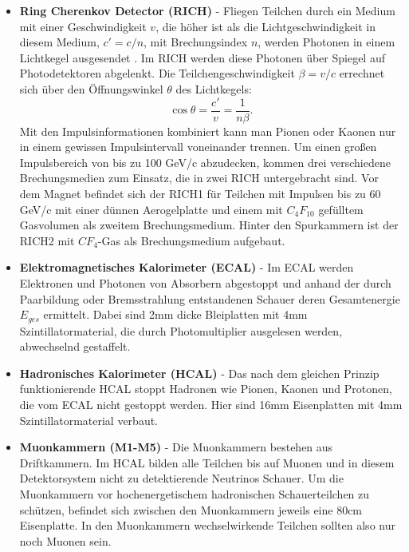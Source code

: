 \documentclass{article}
\begin{document}
\begin{itemize}
\item \textbf{Ring Cherenkov Detector (RICH)}  \cite{SISSA2008} - Fliegen Teilchen durch ein Medium mit einer Geschwindigkeit $v$, die höher ist als die Lichtgeschwindigkeit in diesem Medium, $c'=c/n$, mit Brechungsindex $n$, werden Photonen in einem Lichtkegel ausgesendet \cite{Cerenkov1937}. Im RICH werden diese Photonen über Spiegel auf Photodetektoren abgelenkt. Die Teilchengeschwindigkeit $\beta=v/c$ errechnet sich über den Öffnungswinkel $\theta$ des Lichtkegels: \[ \cos \theta = \frac{c'}{v}=\frac{1}{n \beta}.\] 
Mit den Impulsinformationen kombiniert kann man Pionen oder Kaonen nur in einem gewissen Impulsintervall voneinander trennen. Um einen großen Impulsbereich von bis zu 100 GeV/c abzudecken, kommen drei verschiedene Brechungsmedien zum Einsatz, die in zwei RICH untergebracht sind. Vor dem Magnet befindet sich der RICH1 für Teilchen mit Impulsen bis zu 60 GeV/c mit einer dünnen Aerogelplatte und einem mit $C_4F_{10}$ gefülltem Gasvolumen als zweitem Brechungsmedium. Hinter den Spurkammern ist der RICH2 mit $CF_4$-Gas als Brechungsmedium aufgebaut.


\item \textbf{Elektromagnetisches Kalorimeter (ECAL)}  \cite{SISSA2008} - Im ECAL werden Elektronen und Photonen von Absorbern abgestoppt und anhand der durch Paarbildung oder Bremsstrahlung entstandenen Schauer deren Gesamtenergie $E_{ges}$ ermittelt. Dabei sind 2mm dicke Bleiplatten mit 4mm Szintillatormaterial, die durch Photomultiplier ausgelesen werden, abwechselnd gestaffelt. %

\item \textbf{Hadronisches Kalorimeter (HCAL)}  \cite{SISSA2008} - Das nach dem gleichen Prinzip funktionierende HCAL stoppt Hadronen wie Pionen, Kaonen und Protonen, die vom ECAL nicht gestoppt werden. Hier sind 16mm Eisenplatten mit 4mm Szintillatormaterial verbaut.

\item \textbf{Muonkammern (M1-M5)}  \cite{SISSA2008} - Die Muonkammern bestehen aus Driftkammern. Im HCAL bilden alle Teilchen bis auf Muonen und in diesem Detektorsystem nicht zu detektierende Neutrinos Schauer. Um die Muonkammern vor hochenergetischem hadronischen Schauerteilchen zu schützen, befindet sich zwischen den Muonkammern jeweils eine 80cm Eisenplatte. In den Muonkammern wechselwirkende Teilchen sollten also nur noch Muonen sein. %
\end{itemize}
\end{document}
